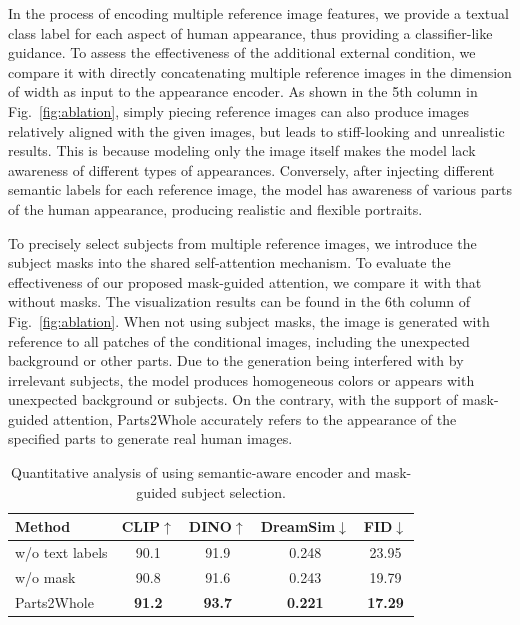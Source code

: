  In the process of encoding multiple reference image features, we provide a textual class label for each aspect of human appearance, thus providing a classifier-like guidance. To assess the effectiveness of the additional external condition, we compare it with directly concatenating multiple reference images in the dimension of width as input to the appearance encoder. As shown in the 5th column in Fig.~\ref{fig:ablation}, simply piecing reference images can also produce images relatively aligned with the given images, but leads to stiff-looking and unrealistic results. This is because modeling only the image itself makes the model lack awareness of different types of appearances. Conversely, after injecting different semantic labels for each reference image, the model has awareness of various parts of the human appearance, producing realistic and flexible portraits.

To precisely select subjects from multiple reference images, we introduce the subject masks into the shared self-attention mechanism. To evaluate the effectiveness of our proposed mask-guided attention, we compare it with that without masks. The visualization results can be found in the 6th column of Fig.~\ref{fig:ablation}. When not using subject masks, the image is generated with reference to all patches of the conditional images, including the unexpected background or other parts. Due to the generation being interfered with by irrelevant subjects, the model produces homogeneous colors or appears with unexpected background or subjects. On the contrary, with the support of mask-guided attention, Parts2Whole accurately refers to the appearance of the specified parts to generate real human images.

\begin{table}\small
  \centering
  \caption{Quantitative analysis of using semantic-aware encoder and mask-guided subject selection.}
  \begin{tabular}{@{}lcccc@{}}
    \toprule
    Method & CLIP$\uparrow$ & DINO$\uparrow$ & DreamSim\cite{fu2023dreamsim}$\downarrow$ & FID$\downarrow$ \\
    \midrule
    w/o text labels & 90.1 & 91.9 & 0.248 & 23.95 \\
    w/o mask & 90.8 & 91.6 & 0.243 & 19.79 \\
   Parts2Whole & \textbf{91.2} & \textbf{93.7} & \textbf{0.221} & \textbf{17.29} \\
    \bottomrule
  \end{tabular}
  \label{tab:abla}
\end{table}
